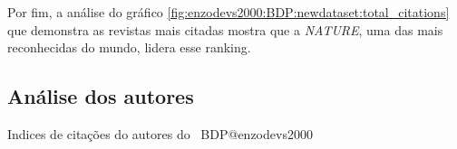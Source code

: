 Por fim, a análise do gráfico \ref{fig:enzodevs2000:BDP:newdataset:total_citations} que demonstra as revistas mais citadas mostra que a \textit{NATURE}, uma das mais reconhecidas do mundo, lidera esse ranking.

\subsection{Análise dos autores}

\begin{table}[htp]
    \centering
{}
    \caption{Indices de citações do autores do \dataset\    BDP@enzodevs2000}
    \label{tab:MASSA2:Media:Citacoes}
\end{table}